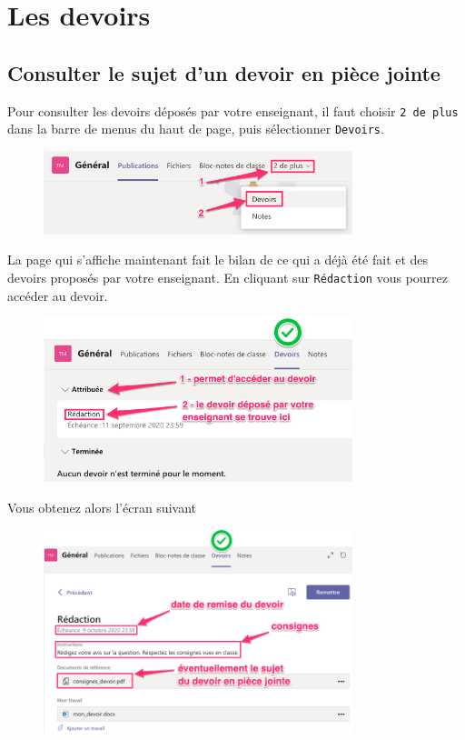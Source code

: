 \section{Les devoirs}

\subsection{Consulter le sujet d'un devoir en pièce jointe}\label{consulterDevoir}
Pour consulter les devoirs déposés par votre enseignant, il faut choisir \texttt{2 de plus} dans la barre de menus du haut de page, puis sélectionner \texttt{Devoirs}.

\begin{figure}[H]
\includegraphics[width=9cm]{./images/teams/devoir1}
\centering
\end{figure}

La page qui s'affiche maintenant fait le bilan de ce qui a déjà été fait et des devoirs proposés par votre enseignant. En cliquant sur \texttt{Rédaction} vous pourrez accéder au devoir.

\begin{figure}[H]
\includegraphics[width=9cm]{./images/teams/devoir2}
\centering
\end{figure}

Vous obtenez alors l'écran suivant

\begin{figure}[H]
\includegraphics[width=9cm]{./images/teams/devoir3}
\centering
\end{figure}

